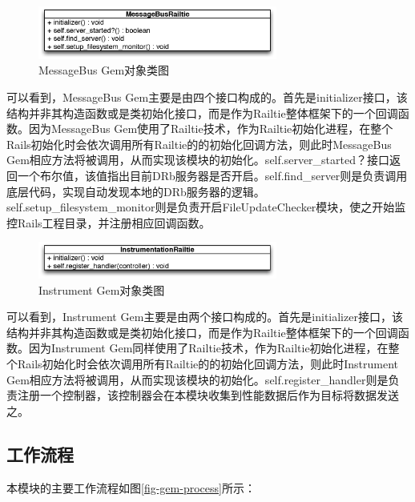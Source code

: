 \begin{figure}[h]
\centering
\includegraphics[width=0.7\textwidth]{images/detail/autoload_class.eps}
\caption{MessageBus Gem对象类图}
\label{fig-autoload-class}
\end{figure}

可以看到，MessageBus Gem主要是由四个接口构成的。首先是initializer接口，该结构并非其构造函数或是类初始化接口，而是作为Railtie整体框架下的一个回调函数。因为MessageBus Gem使用了Railtie技术，作为Railtie初始化进程，在整个Rails初始化时会依次调用所有Railtie的的初始化回调方法，则此时MessageBus Gem相应方法将被调用，从而实现该模块的初始化。self.server\_started？接口返回一个布尔值，该值指出目前DRb服务器是否开启。self.find\_server则是负责调用底层代码，实现自动发现本地的DRb服务器的逻辑。self.setup\_filesystem\_monitor则是负责开启FileUpdateChecker模块，使之开始监控Rails工程目录，并注册相应回调函数。

\begin{figure}[h]
\centering
\includegraphics[width=0.7\textwidth]{images/detail/instrument_class.eps}
\caption{Instrument Gem对象类图}
\label{fig-instrument-class}
\end{figure}

可以看到，Instrument Gem主要是由两个接口构成的。首先是initializer接口，该结构并非其构造函数或是类初始化接口，而是作为Railtie整体框架下的一个回调函数。因为Instrument Gem同样使用了Railtie技术，作为Railtie初始化进程，在整个Rails初始化时会依次调用所有Railtie的的初始化回调方法，则此时Instrument Gem相应方法将被调用，从而实现该模块的初始化。self.register\_handler则是负责注册一个控制器，该控制器会在本模块收集到性能数据后作为目标将数据发送之。

\subsection{工作流程}
本模块的主要工作流程如图\ref{fig-gem-process}所示：

